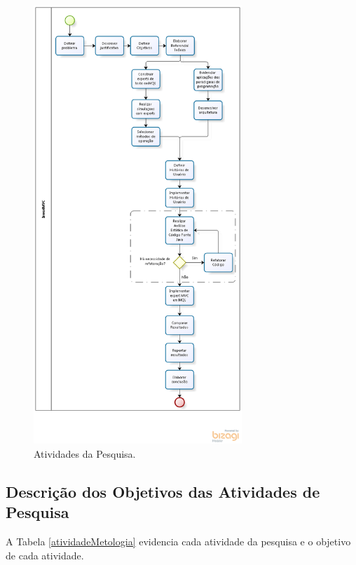 \begin{figure}[H]
\centering
\includegraphics[width=0.7\textwidth]{figuras/metodologia}
\caption{Atividades da Pesquisa.} 
\label{metodologia}
\end{figure}

\subsection{Descrição dos Objetivos das Atividades de Pesquisa}

A Tabela \ref{atividadeMetologia}  evidencia cada atividade da pesquisa e o objetivo de cada atividade.

